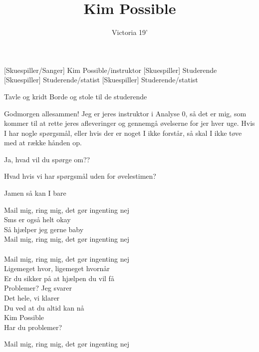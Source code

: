 \documentclass[a4paper,11pt]{article}
\title{Kim Possible}
\author{Victoria 19'}
\begin{document}
\maketitle

\begin{roles}
[Skuespiller/Sanger] Kim Possible/instruktor 
[Skuespiller] Studerende
[Skuespiller] Studerende/statist
[Skuespiller] Studerende/statist
\end{roles}

\begin{props}
 Tavle og kridt
 Borde og stole til de studerende
\end{props}


\begin{sketch}

 Godmorgen allesammen! Jeg er jeres instruktor i Analyse $0$, så det er mig, som kommer til at rette jeres afleveringer og gennemgå øvelserne for jer hver uge. Hvis I har nogle spørgsmål, eller hvis der er noget I ikke forstår, så skal I ikke tøve med at række hånden op. 


 Ja, hvad vil du spørge om??

 Hvad hvis vi har spørgsmål uden for øvelestimen? 

 Jamen så kan I bare 


 Mail mig, ring mig, det gør ingenting nej \\
Sms er også helt okay\\
Så hjælper jeg gerne baby\\
Mail mig, ring mig, det gør ingenting nej\\ \\
 Mail mig, ring mig, det gør ingenting nej \\
Ligemeget hvor, ligemeget hvornår\\
Er du sikker på at hjælpen du vil få\\
Problemer? Jeg svarer\\
Det hele, vi klarer\\
Du ved at du altid kan nå\\
Kim Possible\\

 Har du problemer?

 Mail mig, ring mig, det gør ingenting nej 



\end{sketch}
\end{document}
